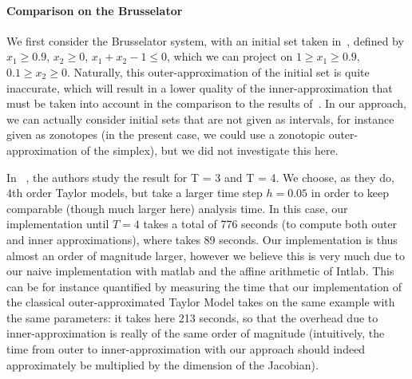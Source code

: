 \paragraph{Comparison on the Brusselator}
We first consider the Brusselator system, with an initial set taken in~\cite{Underapproxflowpipes}, defined by 
$x_1 \geq 0.9$, $x_2 \geq 0$, $x_1+x_2-1 \leq 0$, which we can project on $1 \geq x_1 \geq 0.9$, $0.1 \geq x_2 \geq 0$.
Naturally, this outer-approximation of the initial set is quite inaccurate, which will result in a lower quality of the inner-approximation
that must be taken into account in the comparison to the results of~\cite{Underapproxflowpipes}. In our approach, 
we can actually consider initial sets that are not given as intervals, for instance given as zonotopes 
(in the present case, we could use a zonotopic outer-approximation of the simplex),  
but we did not investigate this here. 

In ~\cite{Underapproxflowpipes}, the authors study the result for T = 3 and T = 4. We choose, as they do, 4th order Taylor models, 
but take a larger time step $h=0.05$ in order to keep comparable (though much larger here) analysis time. In this case, our implementation until $T=4$
takes a total of 776 seconds (to compute both outer and inner approximations), where \cite{Underapproxflowpipes} takes 89 seconds.
Our implementation is thus almost an order of magnitude larger, however we believe this is very much due to our naive implementation 
with matlab and the affine arithmetic of Intlab. This can be for instance quantified by measuring the time  that our implementation of the classical 
outer-approximated Taylor Model takes on the same example with the same parameters: it takes here 213 seconds, so that the overhead due to inner-approximation 
is really of the same order of magnitude (intuitively, the time from outer to inner-approximation with our approach should indeed approximately 
be multiplied by the dimension of the Jacobian). 

